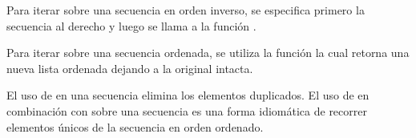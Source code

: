 \documentclass[a5paper,10pt,spanish]{sphinxmanual}
\begin{document}
\sphinxAtStartPar
Para iterar sobre una secuencia en orden inverso, se especifica primero la secuencia al derecho y luego se llama a la función .

\begin{sphinxVerbatim}[commandchars=\\\{\}]
     
    
\end{sphinxVerbatim}

\sphinxAtStartPar
Para iterar sobre una secuencia ordenada, se utiliza la función  la cual retorna una nueva lista ordenada dejando a la original intacta.

\begin{sphinxVerbatim}[commandchars=\\\{\}]
  \PYG{p}{[}     \PYG{p}{]}
   
    
\end{sphinxVerbatim}

\sphinxAtStartPar
El uso de  en una secuencia elimina los elementos duplicados. El uso de  en combinación con  sobre una secuencia es una forma idiomática de recorrer elementos únicos de la secuencia en orden ordenado.
\end{document}
